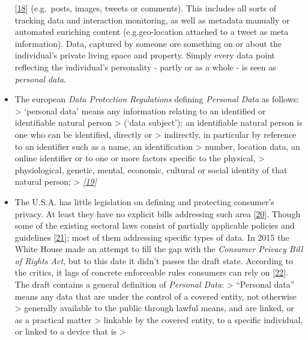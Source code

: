 \documentclass[12pt,english,a4paper,titlepage,cleardoublepage=empty,dottedtoc]{report}
\begin{document}
\begin{itemize}
  {[}\protect\hyperlink{ref-web_2016_wikipedia_intellectual-property}{18}{]}
  (e.g.~posts, images, tweets or comments). This includes all sorts of
  tracking data and interaction monitoring, as well as metadata manually
  or automated enriching content (e.g.geo-location attached to a tweet
  as meta information). Data, captured by someone ore something on or
  about the individual's private living space and property. Simply every
  data point reflecting the individual's personality - partly or as a
  whole - is seen as \emph{personal data}.
\item
  The european \emph{Data Protection Regulations} defining
  \emph{Personal Data} as follows: \textgreater{} `personal data' means
  any information relating to an identified or identifiable natural
  person \textgreater{} (`data subject'); an identifiable natural person
  is one who can be identified, directly or \textgreater{} indirectly,
  in particular by reference to an identifier such as a name, an
  identification \textgreater{} number, location data, an online
  identifier or to one or more factors specific to the physical,
  \textgreater{} physiological, genetic, mental, economic, cultural or
  social identity of that natural person; \textgreater{}
  \emph{{[}\protect\hyperlink{ref-regulation_2016_eu_general-data-protection-regulation_definition}{19}{]}}
\item
  The U.S.A. has little legislation on defining and protecting
  consumer's privacy. At least they have no explicit bills addressing
  such area
  {[}\protect\hyperlink{ref-web_2016_wikipedia_information-privacy-law_us}{20}{]}.
  Though some of the existing sectoral laws consist of partially
  applicable policies and guidelines
  {[}\protect\hyperlink{ref-web_2016_data-protection-laws-in-the-us}{21}{]};
  most of them addressing specific types of data. In 2015 the White
  House made an attempt to fill the gap with the \emph{Consumer Privacy
  Bill of Rights Act}, but to this date it didn't passes the draft
  state. According to the critics, it lags of concrete enforceable rules
  consumers can rely on
  {[}\protect\hyperlink{ref-web_2015_white-house-releases-consumer-privacy-bill-draft}{22}{]}.
  The draft contains a general definition of \emph{Personal Data}:
  \textgreater{} ``Personal data'' means any data that are under the
  control of a covered entity, not otherwise \textgreater{} generally
  available to the public through lawful means, and are linked, or as a
  practical matter \textgreater{} linkable by the covered entity, to a
  specific individual, or linked to a device that is \textgreater{}

\end{itemize}
\end{document}
